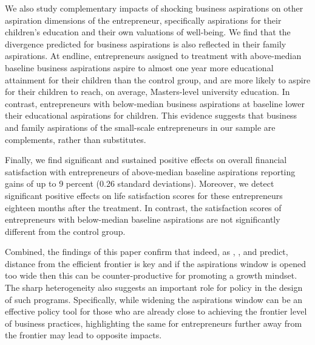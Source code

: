 \documentclass[11.5pt]{article}
\begin{document}
We also study complementary impacts of shocking business aspirations on other aspiration dimensions of the entrepreneur, specifically aspirations for their children's education and their own valuations of well-being. We find that the divergence predicted for business aspirations is also reflected in their family aspirations. At endline, entrepreneurs assigned to treatment with above-median baseline business aspirations aspire to almost one year more educational attainment for their children than the control group, and are more likely to aspire for their children to reach, on average, Masters-level university education. In contrast, entrepreneurs with below-median business aspirations at baseline lower their educational aspirations for children. This evidence suggests that business and family aspirations of the small-scale entrepreneurs in our sample are complements, rather than substitutes.

Finally, we find significant and sustained positive effects on overall financial satisfaction with entrepreneurs of above-median baseline aspirations reporting gains of up to 9 percent (0.26 standard deviations). Moreover, we detect significant positive effects on life satisfaction scores for these entrepreneurs eighteen months after the treatment. In contrast, the satisfaction scores of entrepreneurs with below-median baseline aspirations are not significantly different from the control group.

Combined, the findings of this paper confirm that indeed, as \citet{Ray2006}, \citet{Dalton2016}, and \citet{Genicot2017} predict, distance from the efficient frontier is key and if the aspirations window is opened too wide then this can be counter-productive for promoting a growth mindset. The sharp heterogeneity also suggests an important role for policy in the design of such programs. Specifically, while widening the aspirations window can be an effective policy tool for those who are already close to achieving the frontier level of business practices, highlighting the same for entrepreneurs further away from the frontier may lead to opposite impacts.
\end{document}
